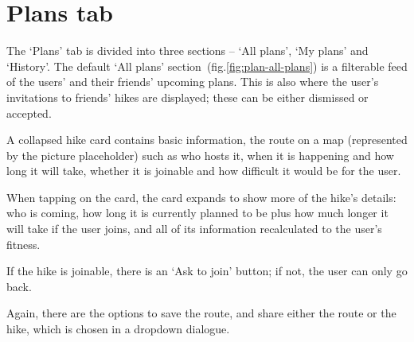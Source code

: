 \section{Plans tab}
The `Plans' tab is divided into three sections -- `All plans', `My plans' and `History'.
The default `All plans' section~(fig.\ref{fig:plan-all-plans}) is a filterable feed of the users' and their friends' upcoming plans.
This is also where the user's invitations to friends' hikes are displayed; these can be either dismissed or accepted.

A collapsed hike card contains basic information, the route on a map (represented by the picture placeholder) such as who hosts it, when it is happening and how long it will take, whether it is joinable and how difficult it would be for the user.

When tapping on the card, the card expands to show more of the hike's details: 
who is coming, how long it is currently planned to be plus how much longer it will take if the user joins, and all of its information recalculated to the user's fitness.

If the hike is joinable, there is an `Ask to join' button; if not, the user can only go back.

Again, there are the options to save the route, and share either the route or the hike, which is chosen in a dropdown dialogue.

